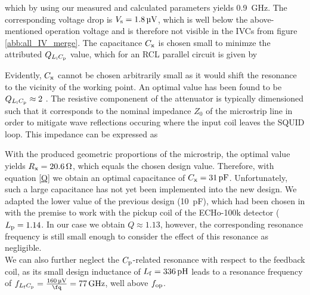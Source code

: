 
which by using our measured and calculated parameters yields \qty{0.9}{\GHz}. The corresponding voltage drop is $V_{\rm s}=\qty{1.8}{\uV}$, which is well below the above-mentioned operation voltage and is therefore not visible in the IVCs from figure \ref{abb:all_IV_merge}. The capacitance $C_{\rm x}$ is chosen small to minimze the attributed $Q_{L_{\rm i}C_{\rm p}}$ value, which for an RCL parallel circuit is given by 



Evidently, $C_{\rm x}$ cannot be chosen arbitrarily small as it would shift the resonance to the vicinity of the working point. An optimal value has been found to be $Q_{L_{\rm i}C_{\rm p}}\approx 2$ \cite{Cantor1996}. The resistive componenent of the attenuator is typically dimensioned such that it corresponds to the nominal impedance $Z_0$ of the microstrip line in order to mitigate wave reflections occuring where the input coil leaves the SQUID loop. This impedance can be expressed as \cite{EnpukuI1991} 


With the produced geometric proportions of the microstrip, the optimal value yields $R_{\rm x}=\qty{20.6}{\ohm}$, which equals the chosen design value. Therefore, with equation \ref{Q} we obtain an optimal capacitance of $C_{\rm x}=\qty{31}{\pF}$. Unfortunately, such a large capacitance has not yet been implemented into the new design. We adapted the lower value of the previous design (\qty{10}{\pF}), which had been chosen in \cite{Bauer2022} with the premise to work with the pickup coil of the ECHo-100k detector ($L_{\rm p}=\qty{1.14}{}$. In our case we obtain $Q\approx 1.13$, however, the corresponding resonance frequency is still small enough to consider the effect of this resonance as negligible. \\
We can also further neglect the $C_{\rm p}$-related resonance with respect to the feedback coil, as its small design inductance of $L_{\rm f}=\qty{336}{\pH}$ leads to a resonance frequency of $f_{L_{\rm f}C_{\rm p}}=\frac{\qty{160}{\uV}}{\unit{\fq}}=\qty{77}{\GHz}$, well above $f_{\rm op}$. 
\\


